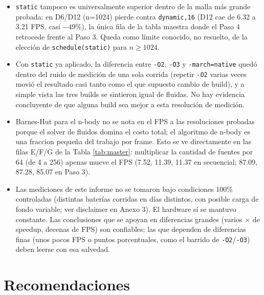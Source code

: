 \documentclass[11pt]{article}
\begin{document}
\begin{itemize}
        94.71 FPS). La causa más probable es desbalance de carga, a
        n=700 con chunks de 64 filas salen apenas $\sim$11 chunks para 20
        hilos, dejando varios hilos sin trabajo. Un chunk fijo no escala
        con el tamaño de la malla.
    \item \texttt{static} tampoco es universalmente superior dentro de la
        malla más grande probada: en D6/D12 (n=1024) pierde contra
        \texttt{dynamic,16} (D12 cae de 6.32 a 3.21 FPS, casi $-49\%$),
        la única fila de la tabla maestra donde el Paso 4 retrocede
        frente al Paso 3. Queda como límite conocido, no resuelto, de la
        elección de \texttt{schedule(static)} para $n \geq 1024$.
    \item Con \texttt{static} ya aplicado, la diferencia entre
        \texttt{-O2}, \texttt{-O3} y \texttt{-march=native} quedó dentro
        del ruido de medición de una sola corrida (repetir \texttt{-O2}
        varias veces movió el resultado casi tanto como el que supuesto
        cambio de build), y a simple vista las tres builds se sintieron
        igual de fluidas. No hay evidencia concluyente de que alguna
        build sea mejor a esta resolución de medición.
    \item Barnes-Hut para el n-body no se nota en el FPS a las
        resoluciones probadas porque el solver de fluidos domina el costo
        total; el algoritmo de n-body es una fraccion pequeña del trabajo
        por frame. Esto se ve directamente en las filas E/F/G de la Tabla
        \ref{tab:master}: multiplicar la cantidad de fuentes por 64 (de 4
        a 256) apenas mueve el FPS (7.52, 11.39, 11.37 en secuencial;
        87.09, 87.28, 85.07 en Paso 3).
    \item Las mediciones de este informe no se tomaron bajo condiciones
        100\% controladas (distintas baterías corridas en días distintos,
        con posible carga de fondo variable; ver disclaimer en Anexo 3).
        El hardware sí se mantuvo constante. Las conclusiones que se
        apoyan en diferencias grandes (varios $\times$ de speedup,
        decenas de FPS) son confiables; las que dependen de diferencias
        finas (unos pocos FPS o puntos porcentuales, como el barrido de
        \texttt{-O2}/\texttt{-O3}) deben leerse con esa salvedad.
\end{itemize}

\newpage

\section{Recomendaciones}
\end{document}
